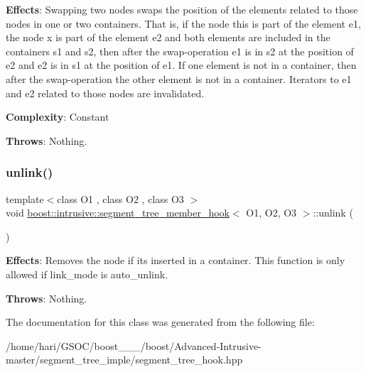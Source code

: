 {\bfseries Effects}\+: Swapping two nodes swaps the position of the elements related to those nodes in one or two containers. That is, if the node this is part of the element e1, the node x is part of the element e2 and both elements are included in the containers s1 and s2, then after the swap-\/operation e1 is in s2 at the position of e2 and e2 is in s1 at the position of e1. If one element is not in a container, then after the swap-\/operation the other element is not in a container. Iterators to e1 and e2 related to those nodes are invalidated.

{\bfseries Complexity}\+: Constant

{\bfseries Throws}\+: Nothing. \mbox{\label{classboost_1_1intrusive_1_1segment__tree__member__hook_abef6cb855778d20e59b11e0f05722ad2}} 
\subsubsection{\texorpdfstring{unlink()}{unlink()}}
{\footnotesize\ttfamily template$<$class O1 , class O2 , class O3 $>$ \\
void \hyperlink{classboost_1_1intrusive_1_1segment__tree__member__hook}{boost\+::intrusive\+::segment\+\_\+tree\+\_\+member\+\_\+hook}$<$ O1, O2, O3 $>$\+::unlink (\begin{DoxyParamCaption}{ }\end{DoxyParamCaption})}

{\bfseries Effects}\+: Removes the node if it\textquotesingle{}s inserted in a container. This function is only allowed if link\+\_\+mode is {\ttfamily auto\+\_\+unlink}.

{\bfseries Throws}\+: Nothing. 

The documentation for this class was generated from the following file\+:\begin{DoxyCompactItemize}
\item 
/home/hari/\+G\+S\+O\+C/boost\+\_\+\_\+\_/boost/\+Advanced-\/\+Intrusive-\/master/segment\+\_\+tree\+\_\+imple/segment\+\_\+tree\+\_\+hook.\+hpp\end{DoxyCompactItemize}
